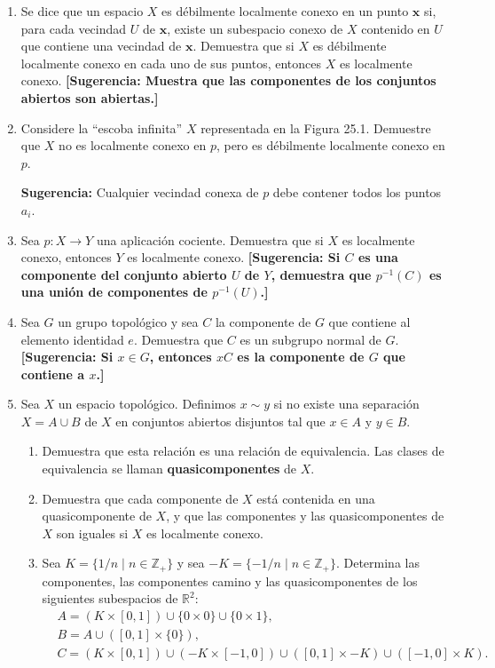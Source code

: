 \documentclass[11pt]{article}
\begin{document}
\begin{enumerate}
    \item Se dice que un espacio $X$ es débilmente localmente conexo en un punto $\mathbf{x}$ si, para cada vecindad $U$ de $\mathbf{x}$, existe un subespacio conexo de $X$ contenido en $U$ que contiene una vecindad de $\mathbf{x}$. Demuestra que si $X$ es débilmente localmente conexo en cada uno de sus puntos, entonces $X$ es localmente conexo. \textbf{[Sugerencia: Muestra que las componentes de los conjuntos abiertos son abiertas.]} 


    \item Considere la ``escoba infinita'' \( X \) representada en la Figura 25.1. Demuestre que \( X \) no es localmente conexo en \( p \), pero es débilmente localmente conexo en \( p \).

\textbf{Sugerencia:} Cualquier vecindad conexa de \( p \) debe contener todos los puntos \( a_i \).

    \item Sea $p: X \to Y$ una aplicación cociente. Demuestra que si $X$ es localmente conexo, entonces $Y$ es localmente conexo. \textbf{[Sugerencia: Si $C$ es una componente del conjunto abierto $U$ de $Y$, demuestra que $p^{-1}(C)$ es una unión de componentes de $p^{-1}(U)$.]}

    \item Sea $G$ un grupo topológico y sea $C$ la componente de $G$ que contiene al elemento identidad $e$. Demuestra que $C$ es un subgrupo normal de $G$. \textbf{[Sugerencia: Si $x \in G$, entonces $xC$ es la componente de $G$ que contiene a $x$.]}

    \item Sea $X$ un espacio topológico. Definimos $x \sim y$ si no existe una separación $X = A \cup B$ de $X$ en conjuntos abiertos disjuntos tal que $x \in A$ y $y \in B$.
    \begin{enumerate}
        \item Demuestra que esta relación es una relación de equivalencia. Las clases de equivalencia se llaman \textbf{quasicomponentes} de $X$.
        \item Demuestra que cada componente de $X$ está contenida en una quasicomponente de $X$, y que las componentes y las quasicomponentes de $X$ son iguales si $X$ es localmente conexo.
        \item Sea $K = \{1/n \mid n \in \mathbb{Z}_+\}$ y sea $-K = \{-1/n \mid n \in \mathbb{Z}_+\}$. Determina las componentes, las componentes camino y las quasicomponentes de los siguientes subespacios de $\mathbb{R}^2$:
        $$
        \begin{aligned}
        & A=(K \times[0,1]) \cup\{0 \times 0\} \cup\{0 \times 1\}, \\
        & B=A \cup([0,1] \times\{0\}), \\
        & C=(K \times[0,1]) \cup(-K \times[-1,0]) \cup([0,1] \times-K) \cup([-1,0] \times K).
        \end{aligned}
        $$
    \end{enumerate}
\end{enumerate}
\end{document}
